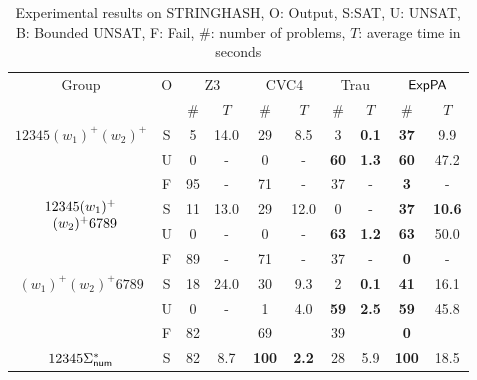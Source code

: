 \begin{table}[ht]
    \caption{Experimental results on STRINGHASH,  O: Output, S:SAT, U: UNSAT, B: Bounded UNSAT, F: Fail, 
    $\#$: number of problems, $T$: average time in seconds}
    \centering

    \renewcommand{\arraystretch}{1.1}
    \begin{tabular}{|c|c|c|c|c|c|c|c|c|c|}
    \hline
        \multirow{2}{*}{Group }  & \multirow{2}{*}{O} & \multicolumn{2}{c|}{Z3} & \multicolumn{2}{c|}{CVC4} &  \multicolumn{2}{c|}{Trau} & \multicolumn{2}{c|}{${\sf ExpPA}$} \\
        \cline{3-10}
       &  & $\#$ & $T$ &  $\#$ & $T$ & $\#$ & $T$ &  $\#$ & $T$ \\ 
       \hline
       \cline{1-10}
       \multirow{3}{*}{\scriptsize{$12345(w_1)^+(w_2)^+$}} & S & 5 & 14.0 & 29 & 8.5 & 3 & {\bf  0.1} & {\bf 37} & 9.9 \\
         \cline{2-10}
        & U & 0 & - & 0 & - & {\bf 60} & {\bf 1.3} & {\bf 60} & 47.2 \\
         \cline{2-10}
        & F & 95 & - & 71 & - & 37 & - & {\bf 3} & - \\ \hline
        \cline{1-10}
       \multirow{3}{*}{\scriptsize{$\begin{array}{l}12345(w_1)^+ \\
       \hspace{2mm}(w_2)^+6789\end{array}$}} & S & 11 & 13.0 & 29 & 12.0 & 0 & - & {\bf 37} & {\bf 10.6} \\
        \cline{2-10}
        & U & 0 & - & 0 & - & {\bf 63} & {\bf 1.2} & {\bf 63} & 50.0 \\
         \cline{2-10}
        & F & 89 & - & 71 & - & 37 & - & {\bf 0} & - \\ \hline
        \cline{1-10}
       \multirow{3}{*}{\scriptsize{$(w_1)^+(w_2)^+6789$}} & S & 18 & 24.0 & 30 & 9.3 & 2 & {\bf  0.1} & {\bf 41} & 16.1 \\
      	 \cline{2-10}
        & U & 0 & - & 1 & 4.0 & {\bf 59} & {\bf 2.5} & {\bf 59} & 45.8 \\
         \cline{2-10}
        & F & 82 &  & 69 &  & 39 &  & {\bf 0} &  \\ \hline
        \cline{1-10}
       \multirow{3}{*}{\scriptsize{$12345\Sigma^*_{\sf num}$}} & S & 82 & 8.7 & {\bf 100} & {\bf 2.2} & 28 & 5.9 & {\bf 100} & 18.5 \\
        \cline{2-10}

\end{tabular}
\end{table}
